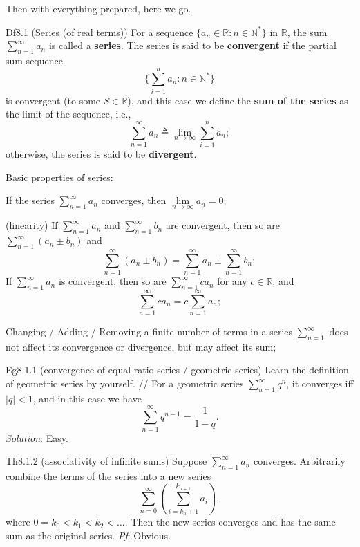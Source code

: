 \documentclass{article}
\begin{document}
Then with everything prepared, here we go. 

\begin{Df}{Df8.1 (Series (of real terms))}
    For a sequence $\{a_n\in\mathbb{R}: n\in\mathbb{N}^\ast\}$ in $\mathbb{R}$, the sum $\sum_{n=1}^{\infty} a_n$ is called a \textbf{series}. The series is said to be \textbf{convergent} if the \textcolor{Df}{partial sum sequence 
    $$ \{\sum_{i=1}^{n} a_n: n\in\mathbb{N}^\ast\} $$}
    is convergent (to some $S\in\mathbb{R}$), and this case we define the \textbf{sum of the series} as the limit of the sequence, i.e.,
    $$ \sum_{n=1}^{\infty} a_n \triangleq \lim_{n\to\infty} \sum_{i=1}^{n} a_n; $$
    otherwise, the series is said to be \textbf{divergent}.
\end{Df}

\begin{Rmk}{}
    \textcolor{Th}{Basic properties of series:
    \begin{compactenum}
        \item If the series $\sum_{n=1}^{\infty} a_n$ converges, then $\lim\limits_{n\to\infty} a_n = 0$;
        \item (linearity) If $\sum_{n=1}^{\infty} a_n$ and $\sum_{n=1}^{\infty} b_n$ are convergent, then so are $\sum_{n=1}^{\infty} (a_n\pm b_n)$ and 
        $$ \sum_{n=1}^{\infty} (a_n\pm b_n) = \sum_{n=1}^{\infty} a_n \pm \sum_{n=1}^{\infty} b_n; $$ If $\sum_{n=1}^{\infty} a_n$ is convergent, then so are $\sum_{n=1}^{\infty} ca_n$ for any $c\in\mathbb{R}$, and 
        $$ \sum_{n=1}^{\infty} ca_n = c\sum_{n=1}^{\infty} a_n; $$ 
        \item Changing / Adding / Removing a finite number of terms in a series $\sum_{n=1}^{\infty}$ does not affect its convergence or divergence, but may affect its sum;
    \end{compactenum}
    }
\end{Rmk}

\begin{Th}{Eg8.1.1 (convergence of equal-ratio-series / geometric series)}
    Learn the definition of geometric series by yourself. //
    For a geometric series $\sum_{n=1}^{\infty} q^{n}$, it converges iff $|q|<1$, and in this case we have 
    $$ \sum_{n=1}^{\infty} q^{n-1} = \frac{1}{1-q}. $$
    \tcblower
    \textit{Solution}: Easy.
\end{Th}

\begin{Th}{Th8.1.2 (associativity of infinite sums)}
    Suppose $\sum_{n=1}^{\infty} a_n$ converges. Arbitrarily combine the terms of the series into a new series
    $$ \sum_{n=0}^{\infty} \left(\sum_{i = k_n+1}^{k_{n+1}} a_{i}\right), $$
    where $0 = k_0 < k_1 < k_2 < \dots$. Then the new series converges and has the same sum as the original series.
    \tcblower
    \textit{Pf}: Obvious.
\end{Th}
\end{document}
